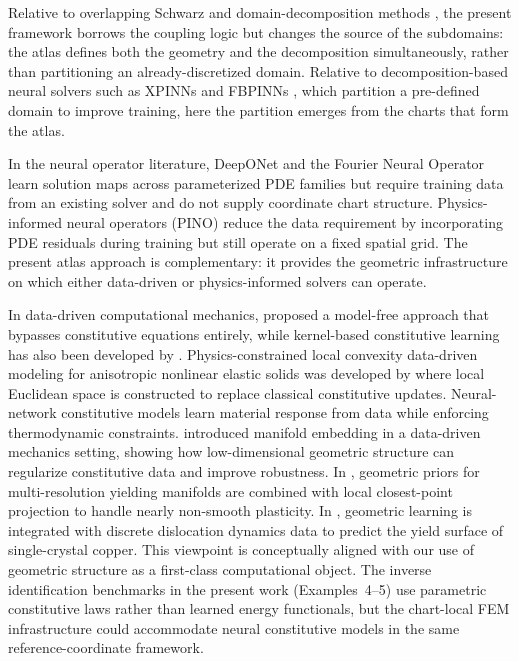 \documentclass[sort&compress]{svjour3} %
\begin{document}
Relative to overlapping Schwarz and domain-decomposition methods \citep{quarteroni1999domain,toselli2005domain}, the present framework borrows the coupling logic but changes the source of the subdomains: the atlas defines both the geometry and the decomposition simultaneously, rather than partitioning an already-discretized domain. Relative to decomposition-based neural solvers such as XPINNs and FBPINNs \citep{jagtap2020xpinns,shukla2021parallel,moseley2021fbpinns}, which partition a pre-defined domain to improve training, here the partition emerges from the charts that form the atlas.

In the neural operator literature, DeepONet \citep{lu2021deeponet} and the Fourier Neural Operator \citep{li2021fno} learn solution maps across parameterized PDE families but require training data from an existing solver and do not supply coordinate chart structure. Physics-informed neural operators (PINO) \citep{li2024pino} reduce the data requirement by incorporating PDE residuals during training but still operate on a fixed spatial grid. The present atlas approach is complementary: it provides the geometric infrastructure on which either data-driven or physics-informed solvers can operate.

In data-driven computational mechanics, \citet{kirchdoerfer2016data} proposed a model-free approach that bypasses constitutive equations entirely, while kernel-based constitutive learning has also been developed by \citet{kanno2021kernel}. Physics-constrained local convexity data-driven modeling for anisotropic nonlinear elastic solids was developed by \citet{he2020physics} where local Euclidean space is constructed to replace classical constitutive updates. Neural-network constitutive models \citep{vlassis2021sobolev,fuhg2024review} learn material response from data while enforcing thermodynamic constraints. \citet{bahmani2022manifold} introduced manifold embedding in a data-driven mechanics setting, showing how low-dimensional geometric structure can regularize constitutive data and improve robustness. In \citet{xiao2022geometric}, geometric priors for multi-resolution yielding manifolds are combined with local closest-point projection to handle nearly non-smooth plasticity. In \citet{jian2024prediction}, geometric learning is integrated with discrete dislocation dynamics data to predict the yield surface of single-crystal copper. This viewpoint is conceptually aligned with our use of geometric structure as a first-class computational object. The inverse identification benchmarks in the present work (Examples~4--5) use parametric constitutive laws rather than learned energy functionals, but the chart-local FEM infrastructure could accommodate neural constitutive models in the same reference-coordinate framework.
\end{document}
